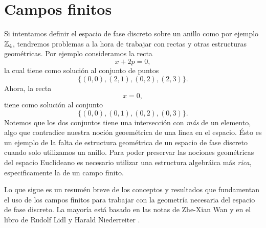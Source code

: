 \section{Campos finitos}
\label{sec:fields}

Si intentamos definir el espacio de fase discreto sobre un
anillo como por ejemplo $\operatorname{\mathbb{Z}}_4$, tendremos problemas a la
hora de trabajar con rectas y otras estructuras geométricas.
Por ejemplo consideramos la recta
\[
  x + 2p = 0,
\]
la cual tiene como solución al conjunto de puntos
\begin{equation}
  \label{eqn:ap_fields_1}
  \{(0,0), (2,1), (0,2), (2,3)\}.
\end{equation} 
Ahora, la recta 
\[
  x = 0,
\] 
tiene como solución al conjunto
\begin{equation}
  \label{eqn:ap_fields_2}
  \{(0,0), (0,1), (0,2), (0,3)\}.
\end{equation} 
Notemos que los dos conjuntos tiene una intersección con
\textit{más} de un elemento, algo que contradice nuestra
noción geoemétrica de una linea en el espacio. Ésto es un
ejemplo de la falta de estructura geométrica de un espacio
de fase discreto cuando solo utilizamos un anillo. Para
poder preservar las nociones geométricas del espacio
Euclideano es necesario utilizar una estructura algebráica
más \textit{rica}, especificamente la de un campo finito.

Lo que sigue es un resumén breve de los conceptos y
resultados que fundamentan el uso de los campos finitos para
trabajar con la geometría necesaria del espacio de fase
discreto. La mayoría está basado en las notas de Zhe-Xian
Wan \cite{wan} y en el libro de Rudolf Lidl y Harald
Niederreiter \cite{lidl1994}.

